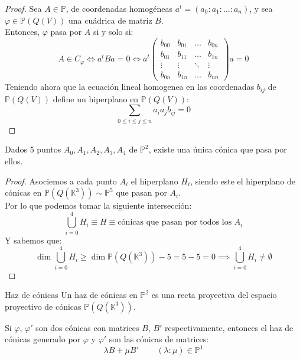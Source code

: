 \begin{proof}
    Sea $A \in \mathbb{P}$, de coordenadas homogéneas $a^t = (a_0 : a_1 : \ldots : a_n)$, y sea $\varphi \in \mathbb{P}(Q(V))$ una cuádrica de matriz $B$.\\
    Entonces, $\varphi$ pasa por $A$ si y solo si:
    \[
    A \in C_{\varphi} \iff
    a^t B a = 0 \iff
    a^t
    \begin{pmatrix}
        b_{00} & b_{01} & \ldots & b_{0n} \\
        b_{01} & b_{11} & \ldots & b_{1n} \\
        \vdots & \vdots & \ddots & \vdots \\
        b_{0n} & b_{1n} & \ldots & b_{nn}
    \end{pmatrix}
    a = 0
    \]
    Teniendo ahora que la ecuación lineal homogenea en las coordenadas $b_{ij}$ de $\mathbb{P}(Q(V))$ define un hiperplano en $\mathbb{P}(Q(V))$:
    \[
    \sum_{0 \leq i \leq j \leq n} a_i a_j b_{ij} = 0
    \]
\end{proof}

\begin{corolario}
    Dados 5 puntos $A_0, A_1, A_2, A_3, A_4$ de $\mathbb{P}^2$, existe una única cónica que pasa por ellos.
\end{corolario}

\begin{proof}
    Asociemos a cada punto $A_i$ el hiperplano $H_i$, siendo este el hiperplano de cónicas en $\mathbb{P}(Q(\mathbb{K}^3)) \sim \mathbb{P}^5$ que pasan por $A_i$.\\
    Por lo que podemos tomar la siguiente intersección:
    \[
    \bigcup_{i=0}^4 H_i \equiv H \equiv \text{cónicas que pasan por todos los } A_i
    \]
    Y sabemos que:
    \[
    \dim \bigcup_{i=0}^4 H_i \geq 
    \dim \mathbb{P}(Q(\mathbb{K}^3)) - 5 = 
    5 - 5 = 
    0 \implies
    \bigcup_{i=0}^4 H_i \neq \emptyset
    \]
\end{proof}

\begin{definición}{Haz de cónicas}
    Un haz de cónicas en $\mathbb{P}^2$ es una recta proyectiva del espacio proyectivo de cónicas $\mathbb{P}(Q(\mathbb{K}^3))$.
\end{definición}

\begin{observación}
    Si $\varphi$, $\varphi'$ son dos cónicas con matrices $B$, $B'$ respectivamente, entonces el haz de cónicas generado por $\varphi$ y $\varphi'$ son las cónicas de matrices:
    \[
    \lambda B + \mu B' \, \qquad (\lambda : \mu) \in \mathbb{P}^1
    \]
\end{observación}

